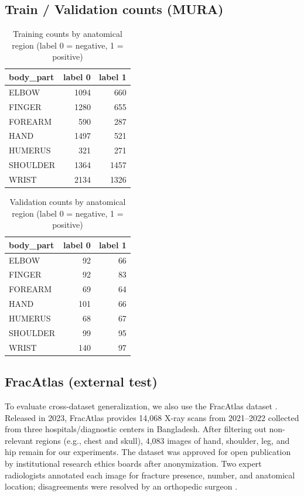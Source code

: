 \documentclass[conference]{IEEEtran}
\begin{document}
\subsection{Train / Validation counts (MURA)}
\begin{table}[H]
  \centering
  \caption{Training counts by anatomical region (label 0 = negative, 1 = positive)}
  \label{tab:train_counts}
  \begin{tabular}{@{}lrr@{}}
    \toprule
    body\_part & label 0 & label 1 \\
    \midrule
    ELBOW   & 1094 & 660 \\
    FINGER  & 1280 & 655 \\
    FOREARM & 590  & 287 \\
    HAND    & 1497 & 521 \\
    HUMERUS & 321  & 271 \\
    SHOULDER& 1364 & 1457 \\
    WRIST   & 2134 & 1326 \\
    \bottomrule
  \end{tabular}
\end{table}

\begin{table}[H]
  \centering
  \caption{Validation counts by anatomical region (label 0 = negative, 1 = positive)}
  \label{tab:val_counts}
  \begin{tabular}{@{}lrr@{}}
    \toprule
    body\_part & label 0 & label 1 \\
    \midrule
    ELBOW   & 92  & 66  \\
    FINGER  & 92  & 83  \\
    FOREARM & 69  & 64  \\
    HAND    & 101 & 66  \\
    HUMERUS & 68  & 67  \\
    SHOULDER& 99  & 95  \\
    WRIST   & 140 & 97  \\
    \bottomrule
  \end{tabular}
\end{table}

\subsection{FracAtlas (external test)}
To evaluate cross-dataset generalization, we also use the FracAtlas dataset \cite{ref12}. Released in 2023, FracAtlas provides 14,068 X-ray scans from 2021--2022 collected from three hospitals/diagnostic centers in Bangladesh. After filtering out non-relevant regions (e.g., chest and skull), 4,083 images of hand, shoulder, leg, and hip remain for our experiments. The dataset was approved for open publication by institutional research ethics boards after anonymization. Two expert radiologists annotated each image for fracture presence, number, and anatomical location; disagreements were resolved by an orthopedic surgeon \cite{ref12}.
\end{document}
